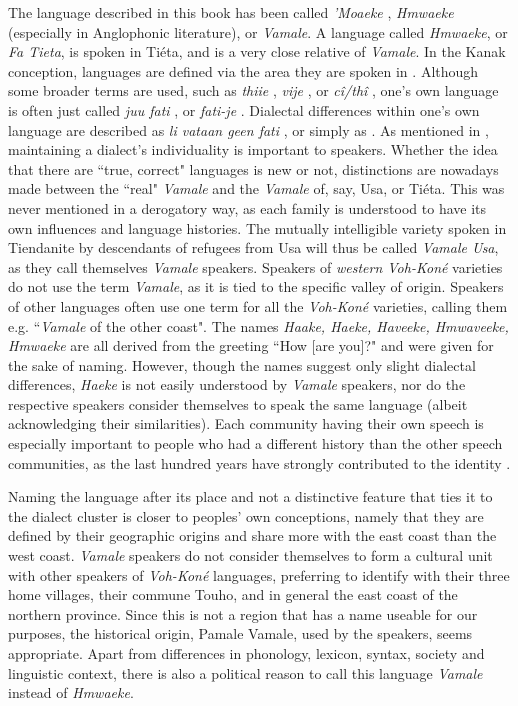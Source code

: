 The language described in this book has been called \textit{'Moaeke} \parencite{leenhardt_langues_1946}, \textit{Hmwaeke} (especially in Anglophonic literature), or \textit{Vamale}. A language called \textit{Hmwaeke}, or \textit{Fa Tieta}, is spoken in Tiéta, and is a very close relative of \textit{Vamale}.  
In the Kanak conception, languages are defined via the area they are spoken in \parencite[40]{sallabank_language_2015}. Although some broader terms are used, such as \textit{thiie} , \textit{vije} , or \textit{cî/thî} , one's own language is often just called \textit{juu fati} , or \textit{fati-je} . Dialectal differences within one's own language are described as \textit{li vataan geen fati} , or simply as . As mentioned in , maintaining a dialect's individuality is important to speakers. Whether the idea that there are ``true, correct" languages is new or not, distinctions are nowadays made between the ``real" \textit{Vamale} and the \textit{Vamale} of, say, Usa, or Tiéta. This was never mentioned in a derogatory way, as each family is understood to have its own influences and language histories. The mutually intelligible variety spoken in Tiendanite by descendants of refugees from Usa will thus be called \textit{Vamale Usa}, as they call themselves \textit{Vamale} speakers. Speakers of \textit{western Voh-Koné} varieties do not use the term \textit{Vamale}, as it is tied to the specific valley of origin. Speakers of other languages often use one term for all the \textit{Voh-Koné} varieties, calling them e.g. ``\textit{Vamale} of the other coast". The names \textit{Haake, Haeke, Haveeke, Hmwaveeke, Hmwaeke} are all derived from the greeting ``How [are you]?" and were given for the sake of naming. 
However, though the names suggest only slight dialectal differences, \textit{Haeke} is not easily understood by \textit{Vamale} speakers, nor do the respective speakers consider themselves to speak the same language (albeit acknowledging their similarities). Each community having their own speech is especially important to people who had a different history than the other speech communities, as the last hundred years have strongly contributed to the identity . 


Naming the language after its place and not a distinctive feature that ties it to the dialect cluster is closer to peoples' own conceptions, namely that they are defined by their geographic origins and share more with the east coast than the west coast. \textit{Vamale} speakers do not consider themselves to form a cultural unit with other speakers of \textit{Voh-Koné} languages, preferring to identify with their three home villages, their commune Touho, and in general the east coast of the northern province. Since this is not a region that has a name useable for our purposes, the historical origin, Pamale \goodtilde Vamale, used by the speakers, seems appropriate. Apart from differences in phonology, lexicon, syntax, society and linguistic context, there is also a political reason to call this language \textit{Vamale} instead of \textit{Hmwaeke}.


